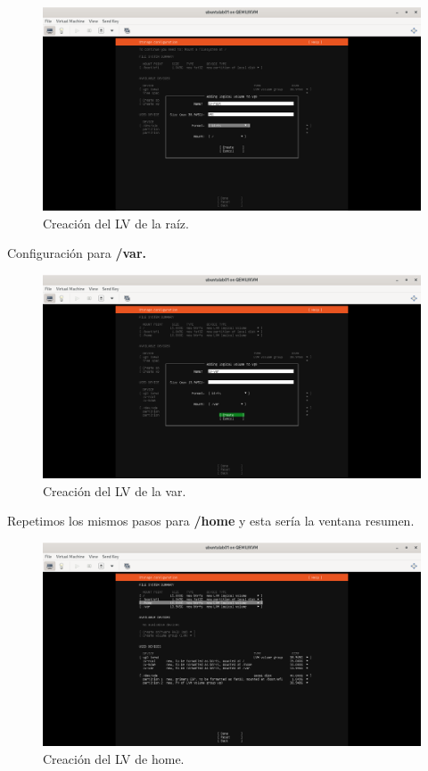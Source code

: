 \begin{figure}[H]
	\centering
	\includegraphics[scale=0.30]{11}
	\caption{Creación del LV de la raíz.}
\end{figure}

Configuración para \textbf{/var.}

\begin{figure}[H]
	\centering
	\includegraphics[scale=0.30]{12}
	\caption{Creación del LV de la var.}
\end{figure}

Repetimos los mismos pasos para \textbf{/home} y esta sería la ventana resumen.

\begin{figure}[H]
	\centering
	\includegraphics[scale=0.30]{13}
	\caption{Creación del LV de home.}
\end{figure}

